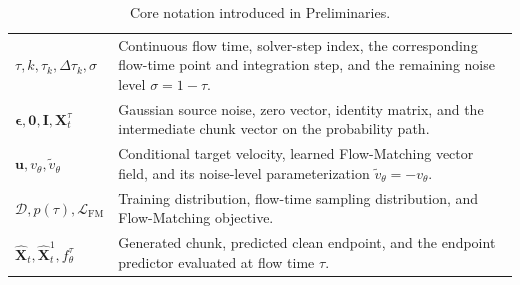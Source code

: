 \begin{table}[H]
\begin{tabular}{p{} p{}}
        $\tau,k,\tau_k,\Delta\tau_k,\sigma$
        & Continuous flow time, solver-step index, the corresponding flow-time point and integration step, and the remaining noise level $\sigma=1-\tau$.\\
        $\boldsymbol{\epsilon},\mathbf{0},\mathbf{I},\mathbf{X}_t^\tau$
        & Gaussian source noise, zero vector, identity matrix, and the intermediate chunk vector on the probability path.\\
        $\mathbf{u},v_\theta,\tilde v_\theta$
        & Conditional target velocity, learned Flow-Matching vector field, and its noise-level parameterization $\tilde v_\theta=-v_\theta$.\\
        $\mathcal{D},p(\tau),\mathcal{L}_{\mathrm{FM}}$
        & Training distribution, flow-time sampling distribution, and Flow-Matching objective.\\
        $\hat{\mathbf{X}}_t,\hat{\mathbf{X}}_t^1,f_\theta^\tau$
        & Generated chunk, predicted clean endpoint, and the endpoint predictor evaluated at flow time $\tau$.\\
        \hline
    \end{tabular}
    \caption{Core notation introduced in Preliminaries.}
    \label{tab:preliminaries-notation}
\end{table}

